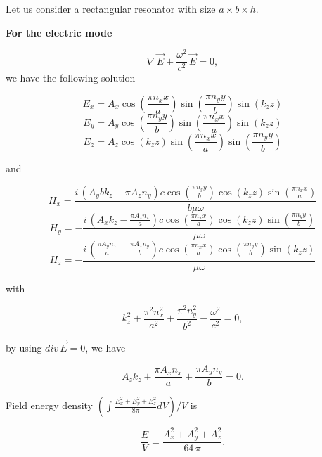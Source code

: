 \documentclass[twoside, 10pt, ptm]{article}
\begin{document}
\begin{multicols}{2}

\setcounter{equation}{0}
\renewcommand{\theequation}{B.\arabic{equation}}

    Let us consider a rectangular resonator with size \(a \times b \times h\).

    \textbf{For the electric mode}

\begin{equation}\nabla\,\vec{E} + \frac{\omega^2}{c^2}\,\vec{E} = 0,\end{equation} we have the
following solution

\[E_{x} = A_{x} \cos\left(\frac{\pi n_{x} x}{a}\right) \sin\left(\frac{\pi n_{y} y}{b}\right) \sin\left(k_{z} z\right)\]
\[E_{y} = A_{y} \cos\left(\frac{\pi n_{y} y}{b}\right) \sin\left(\frac{\pi n_{x} x}{a}\right) \sin\left(k_{z} z\right)\]
\[E_{z} = A_{z} \cos\left(k_{z} z\right) \sin\left(\frac{\pi n_{x} x}{a}\right) \sin\left(\frac{\pi n_{y} y}{b}\right)\]

and

\[H_{x} = \frac{i \, {\left(A_{y} b k_{z} - \pi A_{z} n_{y}\right)} c \cos\left(\frac{\pi n_{y} y}{b}\right) \cos\left(k_{z} z\right) \sin\left(\frac{\pi n_{x} x}{a}\right)}{b \mu \omega}\]
\[H_{y} = -\frac{i \, {\left(A_{x} k_{z} - \frac{\pi A_{z} n_{x}}{a}\right)} c \cos\left(\frac{\pi n_{x} x}{a}\right) \cos\left(k_{z} z\right) \sin\left(\frac{\pi n_{y} y}{b}\right)}{\mu \omega}\]
\[H_{z} = -\frac{i \, {\left(\frac{\pi A_{y} n_{x}}{a} - \frac{\pi A_{x} n_{y}}{b}\right)} c \cos\left(\frac{\pi n_{x} x}{a}\right) \cos\left(\frac{\pi n_{y} y}{b}\right) \sin\left(k_{z} z\right)}{\mu \omega}\]

with

\begin{equation}k_{z}^{2} + \frac{\pi^{2} n_{x}^{2}}{a^{2}} + \frac{\pi^{2} n_{y}^{2}}{b^{2}} - \frac{\omega^{2}}{c^{2}} = 0,\end{equation}

by using \(div\,\vec{E} = 0\), we have

\begin{equation}A_{z} k_{z} + \frac{\pi A_{x} n_{x}}{a} + \frac{\pi A_{y} n_{y}}{b} = 0.\end{equation}

Field energy density
\(\left(\int \frac{E_x^2+E_y^2+E_z^2}{8 \pi}dV\right)\big/{V}\) is

\begin{equation}\frac{E}{V} = \frac{{A_{x}^{2} + A_{y}^{2} + A_{z}^{2}} }{64 \, \pi}.\end{equation}


\end{multicols}
\end{document}
